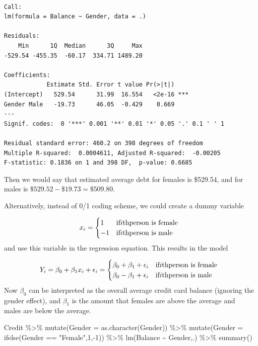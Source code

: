 \documentclass[
  letterpaper,
  DIV=11,
  numbers=noendperiod]{scrreprt}
\newenvironment{Shaded}{\begin{snugshade}}{\end{snugshade}}
\newcommand{\AttributeTok}[1]{\textcolor[rgb]{0.65,0.35,0.00}{#1}}
\newcommand{\DecValTok}[1]{\textcolor[rgb]{0.47,0.16,0.63}{#1}}
\newcommand{\FunctionTok}[1]{\textcolor[rgb]{0.02,0.16,0.49}{#1}}
\newcommand{\NormalTok}[1]{\textcolor[rgb]{0.33,0.33,0.33}{#1}}
\newcommand{\SpecialCharTok}[1]{\textcolor[rgb]{0.00,0.46,0.62}{#1}}
\newcommand{\StringTok}[1]{\textcolor[rgb]{0.00,0.50,0.00}{#1}}
\begin{document}
\begin{verbatim}

Call:
lm(formula = Balance ~ Gender, data = .)

Residuals:
    Min      1Q  Median      3Q     Max 
-529.54 -455.35  -60.17  334.71 1489.20 

Coefficients:
            Estimate Std. Error t value Pr(>|t|)    
(Intercept)   529.54      31.99  16.554   <2e-16 ***
Gender Male   -19.73      46.05  -0.429    0.669    
---
Signif. codes:  0 '***' 0.001 '**' 0.01 '*' 0.05 '.' 0.1 ' ' 1

Residual standard error: 460.2 on 398 degrees of freedom
Multiple R-squared:  0.0004611, Adjusted R-squared:  -0.00205 
F-statistic: 0.1836 on 1 and 398 DF,  p-value: 0.6685
\end{verbatim}

Then we would say that estimated average debt for females is \$529.54,
and for males is \(\$529.52 - \$19.73 = \$509.80\).

Alternatively, instead of 0/1 coding scheme, we could create a dummy
variable

\[
x_i = 
\begin{cases}
1 & \text{if}\space i\text{th}\space \text{person is female} \\
-1 & \text{if}\space i\text{th}\space \text{person is male}
\end{cases}
\] and use this variable in the regression equation. This results in the
model

\[
Y_i = \beta_0 + \beta_1x_i + \epsilon_i = 
\begin{cases}
\beta_0 + \beta_1 + \epsilon_i & \text{if}\space i\text{th}\space \text{person is female} \\
\beta_0 - \beta_1 + \epsilon_i & \text{if}\space i\text{th}\space \text{person is male} 
\end{cases}
\] Now \(\beta_0\) can be interpreted as the overall average credit card
balance (ignoring the gender effect), and \(\beta_1\) is the amount that
females are above the average and males are below the average.

\begin{Shaded}
\begin{Highlighting}[]
\NormalTok{Credit }\SpecialCharTok{\%\textgreater{}\%} 
  \FunctionTok{mutate}\NormalTok{(}\AttributeTok{Gender =} \FunctionTok{as.character}\NormalTok{(Gender)) }\SpecialCharTok{\%\textgreater{}\%} 
  \FunctionTok{mutate}\NormalTok{(}\AttributeTok{Gender =} \FunctionTok{ifelse}\NormalTok{(Gender }\SpecialCharTok{==} \StringTok{"Female"}\NormalTok{,}\DecValTok{1}\NormalTok{,}\SpecialCharTok{{-}}\DecValTok{1}\NormalTok{)) }\SpecialCharTok{\%\textgreater{}\%} 
  \FunctionTok{lm}\NormalTok{(Balance }\SpecialCharTok{\textasciitilde{}}\NormalTok{ Gender,.) }\SpecialCharTok{\%\textgreater{}\%} 
  \FunctionTok{summary}\NormalTok{()}
\end{Highlighting}
\end{Shaded}
\end{document}
